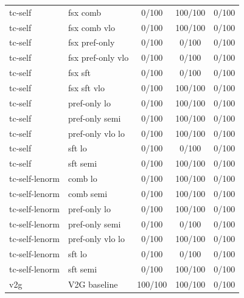 \documentclass[10pt,landscape]{article}
\begin{document}
\begin{tabular}{llccc}
tc-self & fsx comb & \cellcolor{missing}0/100 & \cellcolor{done}100/100 & \cellcolor{missing}0/100 \\
tc-self & fsx comb vlo & \cellcolor{missing}0/100 & \cellcolor{done}100/100 & \cellcolor{missing}0/100 \\
tc-self & fsx pref-only & \cellcolor{missing}0/100 & \cellcolor{missing}0/100 & \cellcolor{missing}0/100 \\
tc-self & fsx pref-only vlo & \cellcolor{missing}0/100 & \cellcolor{missing}0/100 & \cellcolor{missing}0/100 \\
tc-self & fsx sft & \cellcolor{missing}0/100 & \cellcolor{missing}0/100 & \cellcolor{missing}0/100 \\
tc-self & fsx sft vlo & \cellcolor{missing}0/100 & \cellcolor{done}100/100 & \cellcolor{missing}0/100 \\
tc-self & pref-only lo & \cellcolor{missing}0/100 & \cellcolor{done}100/100 & \cellcolor{missing}0/100 \\
tc-self & pref-only semi & \cellcolor{missing}0/100 & \cellcolor{done}100/100 & \cellcolor{missing}0/100 \\
tc-self & pref-only vlo lo & \cellcolor{missing}0/100 & \cellcolor{done}100/100 & \cellcolor{missing}0/100 \\
tc-self & sft lo & \cellcolor{missing}0/100 & \cellcolor{missing}0/100 & \cellcolor{missing}0/100 \\
tc-self & sft semi & \cellcolor{missing}0/100 & \cellcolor{done}100/100 & \cellcolor{missing}0/100 \\
tc-self-lenorm & comb lo & \cellcolor{missing}0/100 & \cellcolor{done}100/100 & \cellcolor{missing}0/100 \\
tc-self-lenorm & comb semi & \cellcolor{missing}0/100 & \cellcolor{done}100/100 & \cellcolor{missing}0/100 \\
tc-self-lenorm & pref-only lo & \cellcolor{missing}0/100 & \cellcolor{done}100/100 & \cellcolor{missing}0/100 \\
tc-self-lenorm & pref-only semi & \cellcolor{missing}0/100 & \cellcolor{missing}0/100 & \cellcolor{missing}0/100 \\
tc-self-lenorm & pref-only vlo lo & \cellcolor{missing}0/100 & \cellcolor{done}100/100 & \cellcolor{missing}0/100 \\
tc-self-lenorm & sft lo & \cellcolor{missing}0/100 & \cellcolor{missing}0/100 & \cellcolor{missing}0/100 \\
tc-self-lenorm & sft semi & \cellcolor{missing}0/100 & \cellcolor{done}100/100 & \cellcolor{missing}0/100 \\
v2g & V2G baseline & \cellcolor{done}100/100 & \cellcolor{done}100/100 & \cellcolor{missing}0/100 \\
\bottomrule
\end{tabular}
\vspace{1em}
\end{document}
